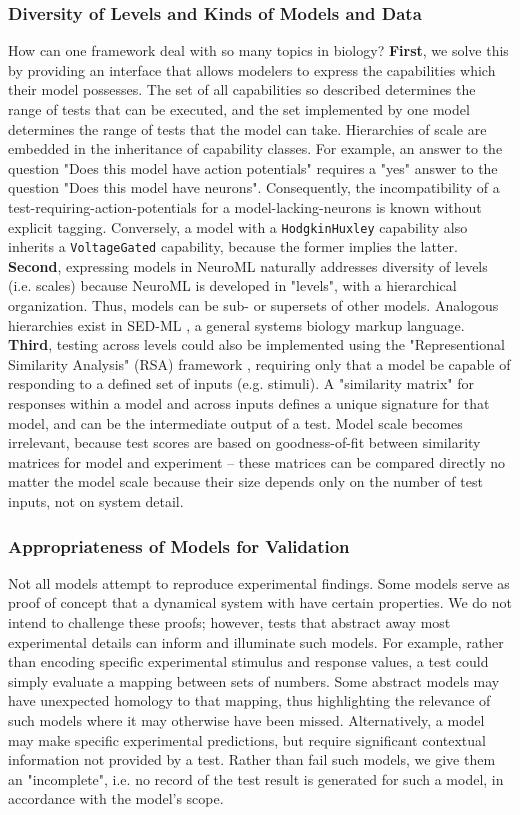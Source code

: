 \documentclass[11pt,letterpaper]{article}
\begin{document}
\subsubsection{Diversity of Levels and Kinds of Models and Data}
How can one framework deal with so many topics in biology?  \textbf{First}, we solve this by providing an interface that allows modelers to express the capabilities which their model possesses.  The set of all capabilities so described determines the range of tests that can be executed, and the set implemented by one model determines the range of tests that the model can take.  Hierarchies of scale are embedded in the inheritance of capability classes.  For example, an answer to the question "Does this model have action potentials" requires a "yes" answer to the question "Does this model have neurons".  Consequently, the incompatibility of a test-requiring-action-potentials for a model-lacking-neurons is known without explicit tagging.  Conversely, a model with a \verb|HodgkinHuxley| capability also inherits a \verb|VoltageGated| capability, because the former implies the latter. \textbf{Second}, expressing models in NeuroML naturally addresses diversity of levels (i.e. scales) because NeuroML is developed in "levels", with a hierarchical organization.  Thus, models can be sub- or supersets of other models.  Analogous hierarchies exist in SED-ML \cite{sedml_url,hucka_systems_2003}, a general systems biology markup language. \textbf{Third}, testing across levels could also be implemented using the "Representional Similarity Analysis" (RSA) framework \cite{kriegeskorte_representational_2008}, requiring only that a model be capable of responding to a defined set of inputs (e.g. stimuli).  A "similarity matrix" for responses within a model and across inputs defines a unique signature for that model, and can be the intermediate output of a test.  Model scale becomes irrelevant, because test scores are based on goodness-of-fit between similarity matrices for model and experiment -- these matrices can be compared directly no matter the model scale because their size depends only on the number of test inputs, not on system detail.  

\subsubsection{Appropriateness of Models for Validation}
Not all models attempt to reproduce experimental findings.  Some models serve as proof of concept that a dynamical system with have certain properties.  We do not intend to challenge these proofs; however, tests that abstract away most experimental details can inform and illuminate such models.  For example, rather than encoding specific experimental stimulus and response values, a test could simply evaluate a mapping between sets of numbers.  Some abstract models may have unexpected homology to that mapping, thus highlighting the relevance of such models where it may otherwise have been missed.  Alternatively, a model may make specific experimental predictions, but require significant contextual information not provided by a test.  Rather than fail such models, we give them an "incomplete", i.e. no record of the test result is generated for such a model, in accordance with the model's scope.  
\end{document}
